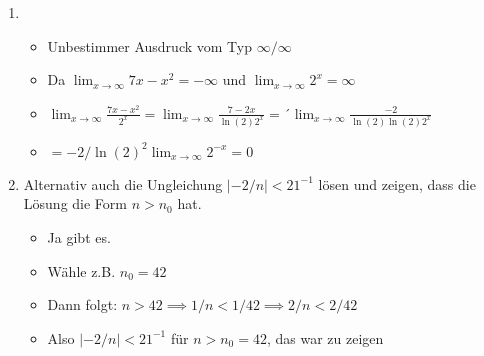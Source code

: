 \item
	\begin{enumerate}
		
	\item 
		\begin{itemize}
			\item Unbestimmer Ausdruck vom Typ $\infty / \infty$
			\item Da $\lim_{x \to \infty} 7x-x^2 = -\infty$ und $\lim_{x \to \infty} 2^x = \infty$
			\item $\lim_{x \to\infty} \frac{7x-x^2}{2^x} = \lim_{x \to\infty} \frac{7-2x}{\ln(2) 2^x} = ´\lim_{x \to\infty} \frac{-2}{\ln(2) \ln(2) 2^x}$
			\item $ = -2/\ln(2)^2 \lim_{x \to\infty} 2^{-x} = 0$
		\end{itemize}
	
	\item Alternativ auch die Ungleichung $|-2/n| < 21^{-1}$ lösen und zeigen, dass die Lösung die Form $n>n_0$ hat.
		\begin{itemize}
			\item Ja gibt es.
			\item Wähle z.B. $n_0=42$
			\item Dann folgt: $n>42 \implies 1/n < 1/42 \implies 2/n < 2/42 $
			\item Also $|-2/n| < 21^{-1}$ für $n>n_0=42$, das war zu zeigen
		\end{itemize}
		
	\end{enumerate}
